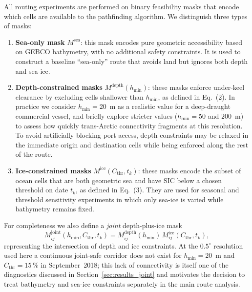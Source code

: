 All routing experiments are performed on binary feasibility masks that
encode which cells are available to the pathfinding algorithm. We
distinguish three types of masks:

\begin{enumerate}
  \item \textbf{Sea-only mask} $M^{\mathrm{sea}}$:
    this mask encodes pure geometric accessibility based on GEBCO
    bathymetry, with no additional safety constraints. It is used to
    construct a baseline ``sea-only'' route that avoids land but ignores
    both depth and sea-ice.

  \item \textbf{Depth-constrained masks}
    $M^{\mathrm{depth}}(h_{\min})$:
    these masks enforce under-keel clearance by excluding cells shallower
    than $h_{\min}$, as defined in Eq.~(2). In practice we
    consider $h_{\min}=20$~m as a realistic value for a deep-draught
    commercial vessel, and briefly explore stricter values
    ($h_{\min}=50$ and $200$~m) to assess how quickly trans-Arctic
    connectivity fragments at this resolution. To avoid artificially
    blocking port access, depth constraints may be relaxed in the
    immediate origin and destination cells while being enforced along
    the rest of the route.

  \item \textbf{Ice-constrained masks}
    $M^{\mathrm{ice}}(C_{\mathrm{thr}}, t_k)$:
    these masks encode the subset of ocean cells that are both
    geometric sea and have SIC below a chosen threshold on date $t_k$,
    as defined in Eq.~(3). They are used for seasonal and threshold
    sensitivity experiments in which only sea-ice is varied while
    bathymetry remains fixed.
\end{enumerate}

For completeness we also define a \emph{joint} depth-plus-ice mask
\begin{equation}
  M^{\mathrm{joint}}_{ij}(h_{\min}, C_{\mathrm{thr}}, t_k)
  = M^{\mathrm{depth}}_{ij}(h_{\min}) \,
    M^{\mathrm{ice}}_{ij}(C_{\mathrm{thr}}, t_k),
\end{equation}
representing the intersection of depth and ice constraints. At the
$0.5^{\circ}$ resolution used here a continuous joint-safe corridor does
not exist for $h_{\min}=20$~m and $C_{\mathrm{thr}}=15$\,\% in
September~2018; this lack of connectivity is itself one of the
diagnostics discussed in Section~\ref{sec:results_joint} and motivates
the decision to treat bathymetry and sea-ice constraints separately in
the main route analysis.

